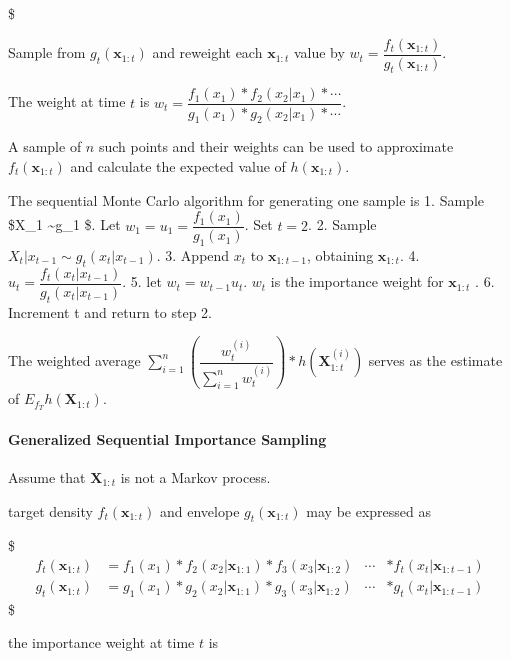 \documentclass[
]{book}
\begin{document}
\$

Sample from \(g_t (\pmb x_{1:t})\) and reweight each \(\pmb x_{1:t}\) value by \(w_t = \dfrac {f_t (\pmb x_{1:t})}{g_t (\pmb x_{1:t})}\).

The weight at time \(t\) is \(w_t = \dfrac {f_1 (x_1) \ast f_2 (x_2 \rvert x_1) \ast \cdots} {g_1 (x_1) \ast g_2 (x_2 \rvert x_1) \ast \cdots}\).

A sample of \(n\) such points and their weights can be used to approximate \(f_t (\pmb x_{1:t} )\) and calculate the expected value of \(h(\pmb x_{1:t} )\).

The sequential Monte Carlo algorithm for generating one sample is
1. Sample \$X\_1 \sim g\_1 \$. Let \(w_1 = u_1 = \dfrac {f_1(x_1)}{g_1(x_1)}\). Set \(t = 2\).
2. Sample \(X_t \rvert x_{t-1} \sim g_t (x_t \rvert x_{t-1})\).
3. Append \(x_t\) to \(\pmb x_{1:t-1}\), obtaining \(\pmb x_{1:t}\).
4. \(u_t = \dfrac{f_t (x_t \rvert x_{t-1})}{g_t (x_t \rvert x_{t-1})}\).
5. let \(w_t = w_{t-1}u_t\). \(w_t\) is the importance weight for \(\pmb x_{1:t}\) .
6. Increment t and return to step 2.

The weighted average \(\sum_{i=1}^n \left( \dfrac {w_t^{(i)}}{\sum_{i=1}^n w_t^{(i)}} \right) \ast h(\pmb X_{1:t}^{(i)})\) serves as the estimate of \(E_{f_T} h(\pmb X_{1:t})\).

\hypertarget{generalized-sequential-importance-sampling}{%
\paragraph{Generalized Sequential Importance Sampling}\label{generalized-sequential-importance-sampling}}

Assume that \(\pmb X_{1:t}\) is not a Markov process.

target density \(f_t (\pmb x_{1:t})\) and envelope \(g_t (\pmb x_{1:t})\) may be expressed as

\$
\begin{align*}

f_t (\pmb x_{1:t}) &= f_1 (x_1) \ast f_2 (x_2 \rvert \pmb x_{1:1}) \ast f_3 (x_3 \rvert \pmb x_{1:2}) &\cdots &\ast f_t (x_t \rvert \pmb x_{1:t-1}) \\

g_t (\pmb x_{1:t}) &= g_1 (x_1) \ast g_2 (x_2 \rvert \pmb x_{1:1}) \ast g_3 (x_3 \rvert \pmb x_{1:2}) &\cdots &\ast g_t (x_t \rvert \pmb x_{1:t-1})
\end{align*}
\$

the importance weight at time \(t\) is
\end{document}
